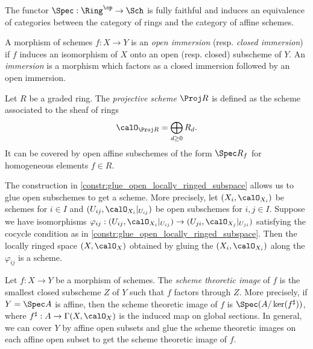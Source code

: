     \begin{theorem}\label{thm:equivalence_between_rings_and_affine_schemes}
        The functor \(\Spec : \Ring^{\op} \to \Sch\) is fully faithful and induces an equivalence of categories between the category of rings and the category of affine schemes.
    \end{theorem}

    \begin{definition}\label{def:open_and_closed_immersion}
        A morphism of schemes \(f : X \to Y\) is an \emph{open immersion} (resp. \emph{closed immersion}) if \(f\) induces an isomorphism of \(X\) onto an open (resp. closed) subscheme of \(Y\).
        An \emph{immersion} is a morphism which factors as a closed immersion followed by an open immersion.
    \end{definition}

    \begin{construction}\label{constr:projective_scheme_Proj_of_graded_rings_as_schemes}
        Let \(R\) be a graded ring. The \emph{projective scheme} \(\Proj R\) is defined as the scheme associated to the sheaf of rings
        \[
            \calO_{\Proj R} = \bigoplus_{d \geq 0} R_d.
        \]
        It can be covered by open affine subschemes of the form \(\Spec R_f\) for homogeneous elements \(f \in R\).
    \end{construction}

    \begin{construction}\label{eg:glue_open_subschemes}
        The construction in \cref{constr:glue_open_locally_ringed_subspace} allows us to glue open subschemes to get a scheme.
        More precisely, let \((X_i, \calO_{X_i})\) be schemes for \(i \in I\) and \((U_{ij}, \calO_{X_i}|_{U_{ij}})\) be open subschemes for \(i,j \in I\).
        Suppose we have isomorphisms \(\varphi_{ij} : (U_{ij}, \calO_{X_i}|_{U_{ij}}) \to (U_{ji}, \calO_{X_j}|_{U_{ji}})\) satisfying the cocycle condition as in \cref{constr:glue_open_locally_ringed_subspace}.
        Then the locally ringed space \((X, \calO_X)\) obtained by gluing the \((X_i, \calO_{X_i})\) along the \(\varphi_{ij}\) is a scheme.
    \end{construction}

    \begin{definition}\label{def:scheme_theoretic_image}
        Let \(f : X \to Y\) be a morphism of schemes.
        The \emph{scheme theoretic image} of \(f\) is the smallest closed subscheme \(Z\) of \(Y\) such that \(f\) factors through \(Z\).
        More precisely, if \(Y = \Spec A\) is affine, then the scheme theoretic image of \(f\) is \(\Spec(A/\ker(f^\sharp))\), where \(f^\sharp : A \to \Gamma(X, \calO_X)\) is the induced map on global sections.
        In general, we can cover \(Y\) by affine open subsets and glue the scheme theoretic images on each affine open subset to get the scheme theoretic image of \(f\).
    \end{definition}

